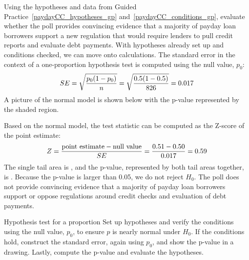 \begin{examplewrap}
\begin{nexample}{Using the hypotheses and data from
    Guided Practice~\ref{paydayCC_hypotheses_gp}
    and~\ref{paydayCC_conditions_gp},
    evaluate whether the poll provides convincing evidence
    that a majority of payday loan borrowers support
    a new regulation that would
    require lenders to pull credit reports
    and evaluate debt payments.}
  With hypotheses already set up and conditions checked,
  we can move onto calculations.
  The standard error in the context of a one-proportion
  hypothesis test is computed using the null value, $p_0$:
  \begin{align*}
  SE = \sqrt{\frac{p_0 (1 - p_0)}{n}}
      = \sqrt{\frac{0.5 (1 - 0.5)}{826{}}}
      = 0.017{}
  \end{align*}
  A picture of the normal model is shown below
  with the p-value represented by the shaded region.
  \begin{center}
  \end{center}
  Based on the normal model, the test statistic can be
  computed as the Z-score of the point estimate:
  \begin{align*}
  Z = \frac{\text{point estimate} - \text{null value}}{SE}
      = \frac{0.51{} - 0.50}{0.017{}}
      = 0.59{}
  \end{align*}
  The single tail area is \paydayCCOneTail{}, and the p-value,
  represented by both tail areas together, is \paydayCCPvalue{}.
  Because the p-value is larger than 0.05,
  we do not reject $H_0$.
  The poll does not provide convincing evidence that
  a majority of payday loan borrowers support or oppose
  regulations around credit checks and evaluation of
  debt payments.
\end{nexample}
\end{examplewrap}

\begin{onebox}{Hypothesis test for a proportion}
Set up hypotheses and verify the conditions using the null value, $p_0$, to ensure $\hat{p}$ is nearly normal under $H_0$. If the conditions hold, construct the standard error, again using $p_0$, and show the p-value in a drawing. Lastly, compute the p-value and evaluate the hypotheses.
\end{onebox}




